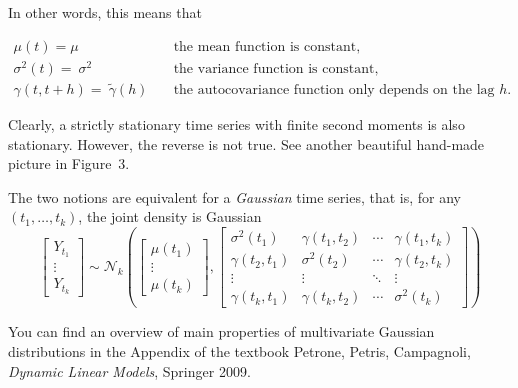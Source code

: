 \documentclass[dvipsnames,12pt]{book}
\begin{document}
\newpage

                In other words, this means that

                \begin{align}
                    \mu(t) = \mu & \quad \text{the mean function is constant}, \\
                    \sigma^2(t) = \ \sigma^2 & \quad \text{the variance function is constant}, \\
                    \gamma(t, t + h) = \ \tilde{\gamma}(h) & \quad\text{the autocovariance function only depends on the lag } h.
                \end{align} 
                
                Clearly, a strictly stationary time series with finite second moments is also stationary. However, the reverse is not true. See another beautiful hand-made picture in Figure~3.
                
                The two notions are equivalent for a \emph{Gaussian} time series, that is, for any $(t_1, \ldots, t_k)$, the joint density is Gaussian
                \[
                \begin{bmatrix}
                Y_{t_1} \\
                \vdots \\
                Y_{t_k}
                \end{bmatrix}
                \sim 
                \mathcal{N}_k \!\left(
                \begin{bmatrix}
                \mu(t_1) \\
                \vdots \\
                \mu(t_k)
                \end{bmatrix},
                \begin{bmatrix}
                \sigma^2(t_1) & \gamma(t_1, t_2) & \cdots & \gamma(t_1, t_k) \\
                \gamma(t_2, t_1) & \sigma^2(t_2) & \cdots & \gamma(t_2, t_k) \\
                \vdots          & \vdots          & \ddots & \vdots          \\
                \gamma(t_k, t_1)& \gamma(t_k, t_2)& \cdots & \sigma^2(t_k)
                \end{bmatrix}
                \right)
                \]
                
                You can find an overview of main properties of multivariate Gaussian distributions in the Appendix of the textbook
                Petrone, Petris, Campagnoli,\emph{ \textit{Dynamic Linear Models}}, Springer 2009.
                
\end{document}
